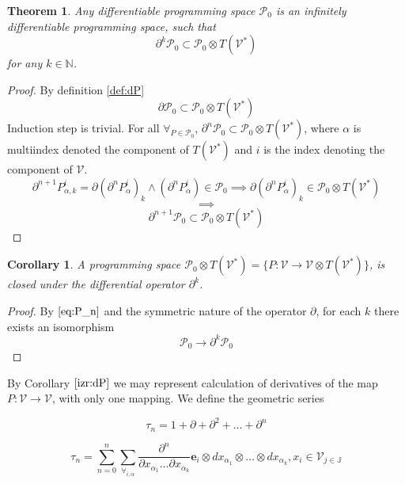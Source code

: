 \documentclass[preprint,12pt]{elsarticle}
\newcommand{\JJ}{\mathbb{J}}
\newcommand{\VV}{\mathcal{V}}
\newcommand{\e}{\mathbf{e}}
\newcommand{\dP}{\mathcal{P}}
\newcommand{\D}{\partial}
\newcommand{\sumd}{\tau}
\newtheorem{izrek}{Theorem}[section]
\newtheorem{corollary}{Corollary}[section]
\begin{document}
\begin{izrek}\label{izr:P}
	Any differentiable programming space $\dP_0$ is an
  infinitely differentiable programming space, such that
	\begin{equation}\label{eq:P_n}
	 		\D^k\dP_0\subset\dP_0\otimes T(\VV^*)
	 	\end{equation}
for any $k\in\mathbb{N}$.
\end{izrek}
\begin{proof} By definition \ref{def:dP}
$$\D\dP_0\subset\dP_0\otimes T(\VV^*)$$
	Induction step is trivial. For all 	$\forall_{P\in\dP_0}$,
  $\D^n\dP_0\subset\dP_0\otimes T(\VV^*)$, where
  $\alpha$ is multiindex denoted the component of $T(\VV^*)$ and $i$ is the
  index denoting the component of $\VV$.
	\begin{equation}\label{eq:inductionStep}
\D^{n+1}P_{\alpha,k}^i=\D(\D^n P^i_\alpha)_k\land(\D^n P^i_\alpha)\in\dP_0\implies \D(\D^n P^i_\alpha)_k\in \dP_0\otimes T(\VV^*)
	\end{equation}
	$$\implies$$
	$$\D^{n+1}\dP_0\subset\dP_0\otimes T(\VV^*)$$
\end{proof}

 \begin{corollary}\label{izr:dP}
	A programming space $\dP_0\otimes T(\VV^*)=\{P:\VV\to \VV\otimes T(\VV^*)\}$, is closed under the differential operator $\D^k$.
 \end{corollary}
 \begin{proof}
 	 By $\eqref{eq:P_n}$ and the symmetric nature of the operator $\D$, for each $k$ there exists an isomorphism
 	 	\begin{equation}
 	 		\dP_0\to\D^k\dP_0
 	 	\end{equation}
 \end{proof}

By Corollary $\ref{izr:dP}$ we may represent calculation of derivatives of the map $P:\VV\to \VV$, with only one mapping. We define the geometric series
 
 \begin{equation}\label{eq:DD}
  	\sumd_n = 1+\D +\D^2 +\ldots + \D^n 
  \end{equation}
  
  
  \begin{equation}
  	\sumd_n=\sum\limits_{n=0}^{n}\sum_{\forall_{i,\alpha}}\frac{\partial^n}{\partial
  		    x_{\alpha_1}\ldots \partial x_{\alpha_k}}\e_i\otimes
  		  dx_{\alpha_1}\otimes\ldots \otimes dx_{\alpha_k} , x_i\in \VV_{j\in\JJ}
  \end{equation}
  
\end{document}
